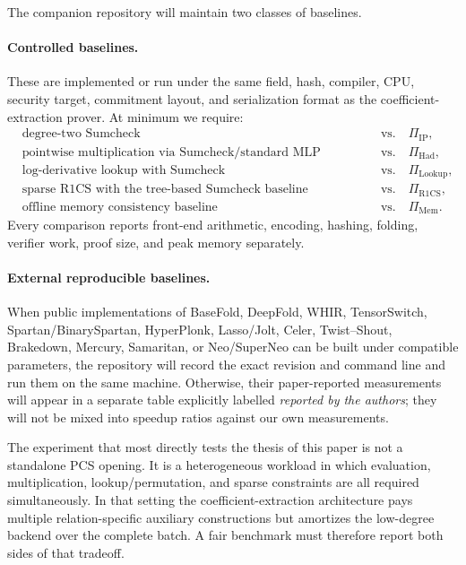 The companion repository will maintain two classes of baselines.

\paragraph{Controlled baselines.}
These are implemented or run under the same field, hash, compiler, CPU, security target, commitment layout, and serialization format as the coefficient-extraction prover.  At minimum we require:
\begin{align*}
  &\text{degree-two Sumcheck}
    &&\text{vs.}\quad \Pi_{\mathrm{IP}},\\
  &\text{pointwise multiplication via Sumcheck/standard MLP reduction}
    &&\text{vs.}\quad \Pi_{\mathrm{Had}},\\
  &\text{log-derivative lookup with Sumcheck}
    &&\text{vs.}\quad \Pi_{\mathrm{Lookup}},\\
  &\text{sparse R1CS with the tree-based Sumcheck baseline}
    &&\text{vs.}\quad \Pi_{\mathrm{R1CS}},\\
  &\text{offline memory consistency baseline}
    &&\text{vs.}\quad \Pi_{\mathrm{Mem}}.
\end{align*}
Every comparison reports front-end arithmetic, encoding, hashing, folding, verifier work, proof size, and peak memory separately.

\paragraph{External reproducible baselines.}
When public implementations of BaseFold, DeepFold, WHIR, TensorSwitch, Spartan/BinarySpartan, HyperPlonk, Lasso/Jolt, Celer, Twist--Shout, Brakedown, Mercury, Samaritan, or Neo/SuperNeo can be built under compatible parameters, the repository will record the exact revision and command line and run them on the same machine.  Otherwise, their paper-reported measurements will appear in a separate table explicitly labelled \emph{reported by the authors}; they will not be mixed into speedup ratios against our own measurements.

\begin{remark}
\label{rem:comparison-criterion}
The experiment that most directly tests the thesis of this paper is not a standalone PCS opening.  It is a heterogeneous workload in which evaluation, multiplication, lookup/permutation, and sparse constraints are all required simultaneously.  In that setting the coefficient-extraction architecture pays multiple relation-specific auxiliary constructions but amortizes the low-degree backend over the complete batch.  A fair benchmark must therefore report both sides of that tradeoff.
\end{remark}

